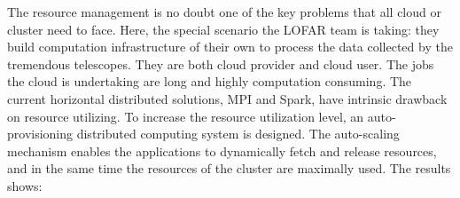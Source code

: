 


\begin{abstracts}        %

The resource management is no doubt one of the key problems that all cloud or cluster need to face. 
Here, the special scenario the LOFAR team is taking: they build computation infrastructure of their own to process the data collected by the tremendous telescopes.
They are both cloud provider and cloud user. The jobs the cloud is undertaking are long and highly computation consuming.
The current horizontal distributed solutions, MPI and Spark, have intrinsic drawback on resource utilizing. 
To increase the resource utilization level, an auto-provisioning distributed computing system is designed. 
The auto-scaling mechanism enables the applications to dynamically fetch and release resources, and in the same time the resources of the cluster are maximally used.
The results shows:%


\end{abstracts}


